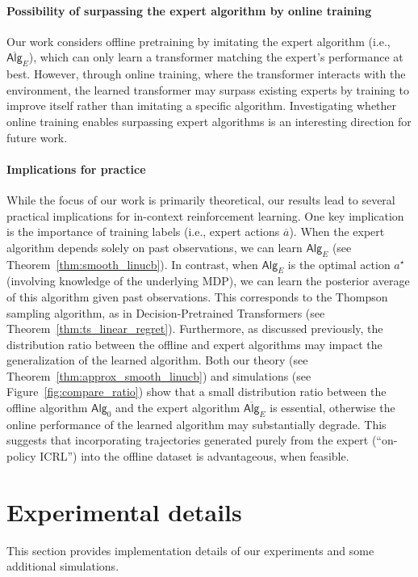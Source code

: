 \documentclass[10pt]{article}
\newcommand{\<}{\left\langle}
\renewcommand{\>}{\right\rangle}
\newcommand{\widebar}[1]{\overline{#1}}
\newcommand{\eaction}{{\widebar{a}}}
\newcommand{\sAlg}{{\mathsf{Alg}}}
\newcommand{\osAlg}{\overline{\mathsf{Alg}}}
\newcommand{\shortexp}{{E}}
\begin{document}
\paragraph{Possibility of surpassing the expert algorithm by online training} Our work considers offline pretraining by imitating the expert algorithm (i.e., $\osAlg_\shortexp$), which can only learn a transformer matching the expert's performance at best. However, through online training, where the transformer interacts with the environment, the learned transformer may surpass existing experts by training to improve itself rather than imitating a specific algorithm. Investigating whether online training enables surpassing expert algorithms is an interesting direction for future work.
\paragraph{Implications for practice} While the focus of our work is primarily theoretical, our results lead to several practical implications for in-context reinforcement learning. One key implication is the importance of training labels (i.e., expert actions $\eaction$). When the expert algorithm depends solely on past observations, we can learn ${\sAlg}_{\shortexp}$ (see Theorem~\ref{thm:smooth_linucb}). In contrast, when ${\sAlg}_{\shortexp}$ is the optimal action $a^\star$ (involving knowledge of the underlying MDP), we can learn the posterior average of this algorithm given past observations. This corresponds to the Thompson sampling algorithm, as in Decision-Pretrained Transformers (see Theorem~\ref{thm:ts_linear_regret}).
Furthermore, as discussed previously, the distribution ratio between the offline and expert algorithms may impact the generalization of the learned algorithm. Both our theory (see Theorem~\ref{thm:approx_smooth_linucb}) and simulations (see Figure~\ref{fig:compare_ratio}) show that a small distribution ratio between the offline algorithm $\sAlg_0$ and the expert algorithm $\osAlg_{\shortexp}$ is essential, otherwise the online performance of the learned algorithm may substantially degrade. This suggests that incorporating trajectories generated purely from the expert (``on-policy ICRL'') into the offline dataset is advantageous, when feasible.
\section{Experimental details}\label{sec:exp_details}
This section provides implementation details of our experiments and some additional simulations.
\end{document}
